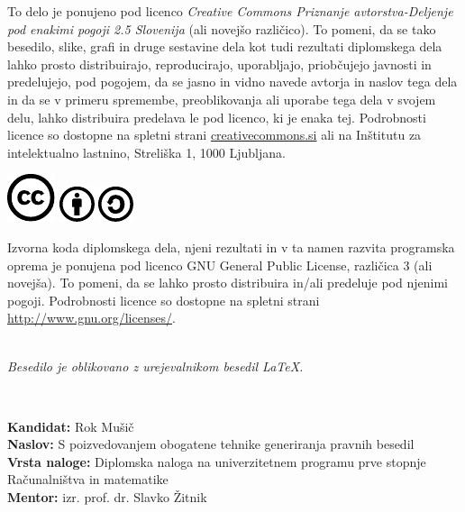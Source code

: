 \documentclass[a4paper,12pt,openright]{book}
\newcommand{\ttitle}{S poizvedovanjem obogatene tehnike generiranja pravnih besedil}
\newcommand{\tauthor}{Rok Mušič}
\newcommand{\clearemptydoublepage}{\newpage{\pagestyle{empty}\cleardoublepage}}
\newcommand{\CcImageCc}[1]{%
	\includegraphics[scale=#1]{cc_cc_30.pdf}%
}
\newcommand{\CcImageBy}[1]{%
	\includegraphics[scale=#1]{cc_by_30.pdf}%
}
\newcommand{\CcImageSa}[1]{%
	\includegraphics[scale=#1]{cc_sa_30.pdf}%
}
\begin{document}
\newpage
\thispagestyle{empty}

\vspace*{5cm}
{\small \noindent
	To delo je ponujeno pod licenco \textit{Creative Commons Priznanje avtorstva-Deljenje pod enakimi pogoji 2.5 Slovenija} (ali novej\v so razli\v cico). To pomeni, da se tako besedilo, slike, grafi in druge sestavine dela kot tudi rezultati diplomskega dela lahko prosto distribuirajo, reproducirajo, uporabljajo, priobčujejo javnosti in predelujejo, pod pogojem, da se jasno in vidno navede avtorja in naslov tega dela in da se v primeru spremembe, preoblikovanja ali uporabe tega dela v svojem delu, lahko distribuira predelava le pod licenco, ki je enaka tej. Podrobnosti licence so dostopne na spletni strani \href{http://creativecommons.si}{creativecommons.si} ali na Inštitutu za intelektualno lastnino, Streliška 1, 1000 Ljubljana.

	\vspace*{1cm}
	\begin{center}%
		\CcImageCc{0.741573033707865}\hspace*{1ex}\CcImageBy{1}\hspace*{1ex}\CcImageSa{1}%
	\end{center}
}

\vspace*{1cm}
{\small \noindent
	Izvorna koda diplomskega dela, njeni rezultati in v ta namen razvita programska oprema je ponujena pod licenco GNU General Public License, različica 3 (ali novejša). To pomeni, da se lahko prosto distribuira in/ali predeluje pod njenimi pogoji. Podrobnosti licence so dostopne na spletni strani \url{http://www.gnu.org/licenses/}.
}

\vfill
\begin{center}
	\ \\ \vfill
	{\em
		Besedilo je oblikovano z urejevalnikom besedil \LaTeX.}
\end{center}

\clearemptydoublepage

\thispagestyle{empty}
\
\vfill

\bigskip
\noindent\textbf{Kandidat:} \tauthor\\
\noindent\textbf{Naslov:} \ttitle\\
\noindent\textbf{Vrsta naloge:} Diplomska naloga na univerzitetnem programu prve stopnje Računalništva in matematike \\
\noindent\textbf{Mentor:} izr. prof. dr. Slavko Žitnik\\
\end{document}
